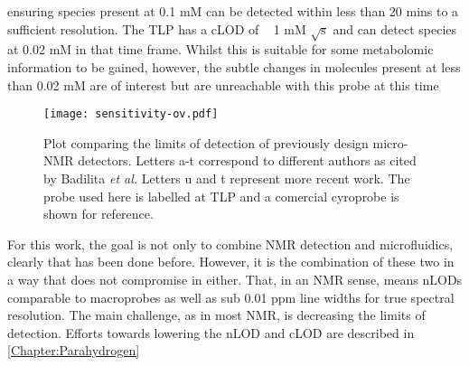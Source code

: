 ensuring species present at 0.1 mM can be detected within less than 20 mins to a sufficient resolution. The TLP has a cLOD of
~ 1 mM $\sqrt{\text{s}}$ and can detect species at 0.02 mM in that time frame. Whilst this is suitable for some metabolomic information to be
gained, however, the subtle changes in molecules present at less than 0.02 mM are of interest but
are unreachable with this probe at this time
\begin{figure}
  \texttt{[image: sensitivity-ov.pdf]}
  \caption{Plot comparing the limits of detection of previously design micro-NMR detectors. Letters
  a-t correspond to different authors as cited by Badilita \textit{et al.}\citep{Badilita:2011td} Letters u\citep{Meier:2014ds}
  and t\citep{RN165} represent more recent work. The probe used here is labelled at TLP and a comercial cyroprobe is shown for reference.}
  \label{fig:cLOD}
\end{figure}

For this work, the goal is not only to combine NMR detection and microfluidics, clearly that has been done before. However,
it is the combination of these two in a way that does not compromise in either. That, in an NMR sense, means nLODs
comparable to macroprobes as well as sub 0.01 ppm line widths for true spectral resolution. The main
challenge, as in most NMR, is decreasing the limits of detection. Efforts towards
lowering the nLOD and cLOD are described in \ref{Chapter:Parahydrogen}
